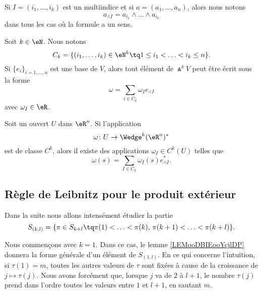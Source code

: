 \begin{normaltext}
	Si \( I=(i_1,\ldots,i_k)\) est un multiindice et si \( a=(a_1,\ldots,a_n)\), alors nous notons
	\begin{equation}
		a_{\wedge I}=a_{i_1}\wedge \ldots \wedge a_{i_k}
	\end{equation}
	dans tous les cas où la formule a un sens.
\end{normaltext}

\begin{proposition}		\label{PROPooSDVXooLvwPbg}
	Soit \( k\in \eN\). Nous notons
	\begin{equation}
		C_k=\{ (i_1,\ldots,i_k)\in \eN^k\tq 1\leq i_1<\ldots <i_k\leq n \}.
	\end{equation}
	Si \( \{ e_i \}_{i=1,\ldots, n}\) est une base de \( V\), alors tout élément de \( \Wedge^kV\) peut être écrit sous la forme
	\begin{equation}
		\omega=\sum_{i\in C_k}\omega_Ie_{\wedge I}
	\end{equation}
	avec \( \omega_I\in \eR\).
\end{proposition}
\ssdem

\begin{proposition}		\label{PROPooDXTOooKYDOiI}
	Soit un ouvert \( U\) dans \( \eR^n\). Si l'application
	\begin{equation}
		\omega \colon U\to \Wedge^k(\eR^n)^*
	\end{equation}
	est de classe \( C^k\), alors il existe des applications \( \omega_I\in C^k(U)\) telles que
	\begin{equation}
		\omega(s)=\sum_{I\in C_k}\omega_I(s)e^*_{\wedge I}.
	\end{equation}
\end{proposition}

\ssdem

\subsection{Règle de Leibnitz pour le produit extérieur}

Dans la suite nous allons intensément étudier la partie
\begin{equation}
	S_{(k,l)}=\{ \pi\in S_{k+l}\tq \pi(1)<\ldots <\pi(k),\,\pi(k+1)<\ldots <\pi(k+l) \}.
\end{equation}

Nous commençons avec \( k=1\). Dans ce cas, le lemme \ref{LEMooDBIEooYcjlDP} donnera la forme générale d'un élément de \( S_{(1,l)}\). En ce qui concerne l'intuition, si \( \tau(1)=m\), toutes les autres valeurs de \( \tau\) sont fixées à cause de la croissance de \( j\mapsto \tau(j)\). Nous avons forcément que, lorsque \( j\) va de \( 2\) à \( l+1\), le nombre \( \tau(j)\) prend dans l'ordre toutes les valeurs entre \( 1\) et \( l+1\), en sautant \( m\).


